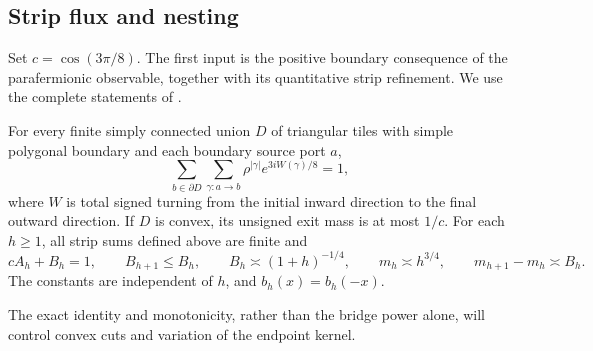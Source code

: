 \subsection{Strip flux and nesting}
Set \(c=\cos(3\pi/8)\). The first input is the positive boundary
consequence of the parafermionic observable, together with its quantitative
strip refinement. We use the complete statements of
\cite[Theorem 1.1 and Lemma 2.1]{StripCompanion}.
\begin{theorem}\label{thm:01-strip}\label{lem:01-boundary}
For every finite simply connected union \(D\) of triangular tiles with
simple polygonal boundary and each boundary source port \(a\),
\[
 \sum_{b\in\partial D}\sum_{\gamma:a\to b}
       \rho^{|\gamma|}e^{3iW(\gamma)/8}=1,
\]
where \(W\) is total signed turning from the initial inward direction to
the final outward direction. If \(D\) is convex, its unsigned exit mass
is at most \(1/c\). For each \(h\ge1\), all strip sums defined above
are finite and
\[
 cA_h+B_h=1,\qquad B_{h+1}\le B_h,\qquad
 B_h\asymp(1+h)^{-1/4},\qquad
 m_h\asymp h^{3/4},\qquad m_{h+1}-m_h\asymp B_h.
\]
The constants are independent of \(h\), and \(b_h(x)=b_h(-x)\).
\end{theorem}
The exact identity and monotonicity, rather than the bridge power alone,
will control convex cuts and variation of the endpoint kernel.

